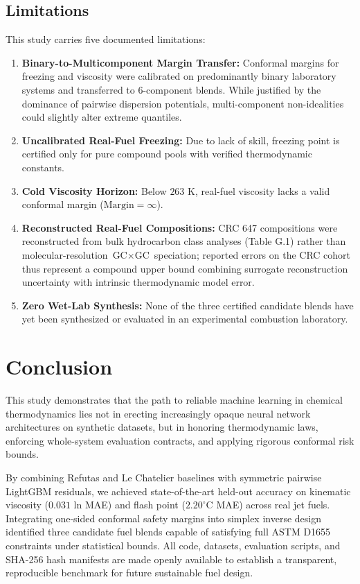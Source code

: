 \documentclass[11pt,a4paper]{article}
\begin{document}
\subsection{Limitations}
This study carries five documented limitations:
\begin{enumerate}
    \item \textbf{Binary-to-Multicomponent Margin Transfer:} Conformal margins for freezing and viscosity were calibrated on predominantly binary laboratory systems and transferred to 6-component blends. While justified by the dominance of pairwise dispersion potentials, multi-component non-idealities could slightly alter extreme quantiles.
    \item \textbf{Uncalibrated Real-Fuel Freezing:} Due to lack of skill, freezing point is certified only for pure compound pools with verified thermodynamic constants.
    \item \textbf{Cold Viscosity Horizon:} Below $263\text{ K}$, real-fuel viscosity lacks a valid conformal margin ($\text{Margin} = \infty$).
    \item \textbf{Reconstructed Real-Fuel Compositions:} CRC 647 compositions were reconstructed from bulk hydrocarbon class analyses (Table G.1) rather than molecular-resolution $\text{GC}\times\text{GC}$ speciation; reported errors on the CRC cohort thus represent a compound upper bound combining surrogate reconstruction uncertainty with intrinsic thermodynamic model error.
    \item \textbf{Zero Wet-Lab Synthesis:} None of the three certified candidate blends have yet been synthesized or evaluated in an experimental combustion laboratory.
\end{enumerate}

\section{Conclusion}
This study demonstrates that the path to reliable machine learning in chemical thermodynamics lies not in erecting increasingly opaque neural network architectures on synthetic datasets, but in honoring thermodynamic laws, enforcing whole-system evaluation contracts, and applying rigorous conformal risk bounds. 

By combining Refutas and Le Chatelier baselines with symmetric pairwise LightGBM residuals, we achieved state-of-the-art held-out accuracy on kinematic viscosity ($0.031\text{ ln}$ MAE) and flash point ($2.20^\circ\text{C}$ MAE) across real jet fuels. Integrating one-sided conformal safety margins into simplex inverse design identified three candidate fuel blends capable of satisfying full ASTM D1655 constraints under statistical bounds. All code, datasets, evaluation scripts, and SHA-256 hash manifests are made openly available to establish a transparent, reproducible benchmark for future sustainable fuel design.
\end{document}
